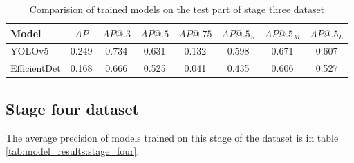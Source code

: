 \begin{table}[H]
    \centering
    \begin{tabular}{|l|c|c|c|c|c|c|c|}
        \hline
        Model        & $AP$  & $AP@.3$ & $AP@.5$ & $AP@.75$ & $AP@.5_S$ & $AP@.5_M$ & $AP@.5_L$ \\ \hline
        YOLOv5       & 0.249 & 0.734   & 0.631   & 0.132    & 0.598     & 0.671     & 0.607     \\ \hline
        EfficientDet & 0.168 & 0.666   & 0.525   & 0.041    & 0.435     & 0.606     & 0.527     \\ \hline
    \end{tabular}
    \caption{Comparision of trained models on the test part of stage three dataset}
    \label{tab:model_results:stage_three:test}
\end{table}


\subsection{Stage four dataset}
The average precision of models trained on this stage of the dataset is in table \ref{tab:model_results:stage_four}.


